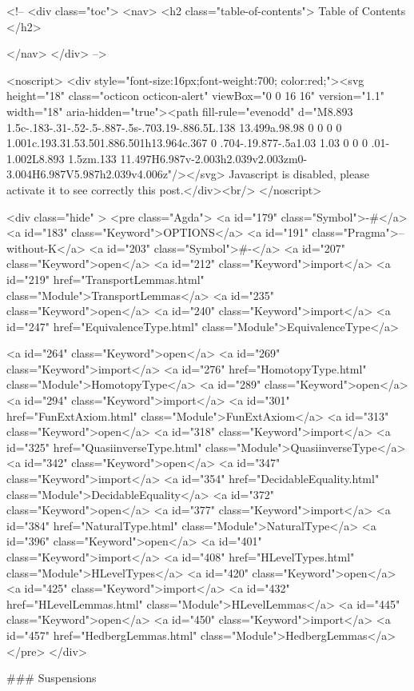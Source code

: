   <!-- 
  <div class="toc">
    <nav>
    <h2 class="table-of-contents"> Table of Contents </h2>
      

    </nav>
  </div>
   -->

  <noscript>
  <div style="font-size:16px;font-weight:700; color:red;"><svg height="18" class="octicon octicon-alert" viewBox="0 0 16 16" version="1.1" width="18" aria-hidden="true"><path fill-rule="evenodd" d="M8.893 1.5c-.183-.31-.52-.5-.887-.5s-.703.19-.886.5L.138 13.499a.98.98 0 0 0 0 1.001c.193.31.53.501.886.501h13.964c.367 0 .704-.19.877-.5a1.03 1.03 0 0 0 .01-1.002L8.893 1.5zm.133 11.497H6.987v-2.003h2.039v2.003zm0-3.004H6.987V5.987h2.039v4.006z"/></svg> Javascript is disabled, please activate it to see correctly this post.</div><br/>
  </noscript>

  <div class="hide" >
<pre class="Agda">
<a id="179" class="Symbol">{-#</a> <a id="183" class="Keyword">OPTIONS</a> <a id="191" class="Pragma">--without-K</a> <a id="203" class="Symbol">#-}</a>
<a id="207" class="Keyword">open</a> <a id="212" class="Keyword">import</a> <a id="219" href="TransportLemmas.html" class="Module">TransportLemmas</a>
<a id="235" class="Keyword">open</a> <a id="240" class="Keyword">import</a> <a id="247" href="EquivalenceType.html" class="Module">EquivalenceType</a>

<a id="264" class="Keyword">open</a> <a id="269" class="Keyword">import</a> <a id="276" href="HomotopyType.html" class="Module">HomotopyType</a>
<a id="289" class="Keyword">open</a> <a id="294" class="Keyword">import</a> <a id="301" href="FunExtAxiom.html" class="Module">FunExtAxiom</a>
<a id="313" class="Keyword">open</a> <a id="318" class="Keyword">import</a> <a id="325" href="QuasiinverseType.html" class="Module">QuasiinverseType</a>
<a id="342" class="Keyword">open</a> <a id="347" class="Keyword">import</a> <a id="354" href="DecidableEquality.html" class="Module">DecidableEquality</a>
<a id="372" class="Keyword">open</a> <a id="377" class="Keyword">import</a> <a id="384" href="NaturalType.html" class="Module">NaturalType</a>
<a id="396" class="Keyword">open</a> <a id="401" class="Keyword">import</a> <a id="408" href="HLevelTypes.html" class="Module">HLevelTypes</a>
<a id="420" class="Keyword">open</a> <a id="425" class="Keyword">import</a> <a id="432" href="HLevelLemmas.html" class="Module">HLevelLemmas</a>
<a id="445" class="Keyword">open</a> <a id="450" class="Keyword">import</a> <a id="457" href="HedbergLemmas.html" class="Module">HedbergLemmas</a>
</pre>
</div>

### Suspensions

